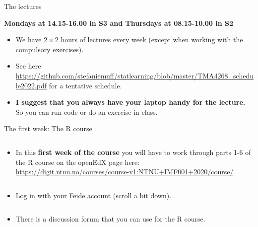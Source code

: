 \documentclass[10pt,ignorenonframetext,]{beamer}
\providecommand{\tightlist}{%
  \setlength{\itemsep}{0pt}\setlength{\parskip}{0pt}}
\begin{document}
\begin{frame}

\begin{block}{The lectures}

\vspace{2mm}

\textbf{Mondays at 14.15-16.00 in S3 and Thursdays at 08.15-10.00 in S2}

\vspace{2mm}

\begin{itemize}
\tightlist
\item
  We have \(2\times 2\) hours of lectures every week (except when
  working with the compulsory exercises).
\end{itemize}

\vspace{2mm}

\begin{itemize}
\tightlist
\item
  See here
  \url{https://github.com/stefaniemuff/statlearning/blob/master/TMA4268_schedule2022.pdf}
  for a tentative schedule.
\end{itemize}

\vspace{2mm}

\begin{itemize}
\tightlist
\item
  \textbf{I suggest that you always have your laptop handy for the
  lecture.} So you can run code or do an exercise in class.
\end{itemize}

\end{block}

\end{frame}

\begin{frame}

\begin{block}{The first week: The R course}

\(~\)

\begin{itemize}
\tightlist
\item
  In this \textbf{first week of the course} you will have to work
  through parts 1-6 of the R course on the openEdX page here:
  \url{https://digit.ntnu.no/courses/course-v1:NTNU+IMF001+2020/course/}
\end{itemize}

\(~\)

\begin{itemize}
\tightlist
\item
  Log in with your Feide account (scroll a bit down).
\end{itemize}

\(~\)

\begin{itemize}
\tightlist
\item
  There is a discussion forum that you can use for the R course.
\end{itemize}

\end{block}

\end{frame}
\end{document}
